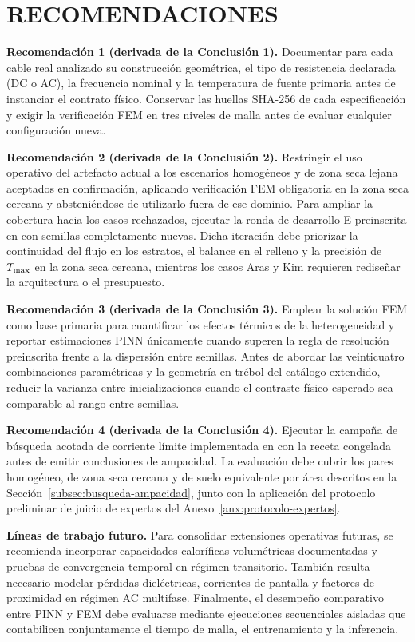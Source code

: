 \section{RECOMENDACIONES}

\textbf{Recomendación 1 (derivada de la Conclusión 1).} Documentar para cada cable real analizado su construcción geométrica, el tipo de resistencia declarada (DC o AC), la frecuencia nominal y la temperatura de fuente primaria antes de instanciar el contrato físico. Conservar las huellas SHA-256 de cada especificación y exigir la verificación FEM en tres niveles de malla antes de evaluar cualquier configuración nueva.

\textbf{Recomendación 2 (derivada de la Conclusión 2).} Restringir el uso operativo del artefacto actual a los escenarios homogéneos y de zona seca lejana aceptados en confirmación, aplicando verificación FEM obligatoria en la zona seca cercana y absteniéndose de utilizarlo fuera de ese dominio. Para ampliar la cobertura hacia los casos rechazados, ejecutar la ronda de desarrollo E preinscrita en  con semillas completamente nuevas. Dicha iteración debe priorizar la continuidad del flujo en los estratos, el balance en el relleno y la precisión de $T_{\max}$ en la zona seca cercana, mientras los casos Aras y Kim requieren rediseñar la arquitectura o el presupuesto.

\textbf{Recomendación 3 (derivada de la Conclusión 3).} Emplear la solución FEM como base primaria para cuantificar los efectos térmicos de la heterogeneidad y reportar estimaciones PINN únicamente cuando superen la regla de resolución preinscrita frente a la dispersión entre semillas. Antes de abordar las veinticuatro combinaciones paramétricas y la geometría en trébol del catálogo extendido, reducir la varianza entre inicializaciones cuando el contraste físico esperado sea comparable al rango entre semillas.

\textbf{Recomendación 4 (derivada de la Conclusión 4).} Ejecutar la campaña de búsqueda acotada de corriente límite implementada en  con la receta congelada antes de emitir conclusiones de ampacidad. La evaluación debe cubrir los pares homogéneo, de zona seca cercana y de suelo equivalente por área descritos en la Sección~\ref{subsec:busqueda-ampacidad}, junto con la aplicación del protocolo preliminar de juicio de expertos del Anexo~\ref{anx:protocolo-expertos}.

\textbf{Líneas de trabajo futuro.} Para consolidar extensiones operativas futuras, se recomienda incorporar capacidades caloríficas volumétricas documentadas y pruebas de convergencia temporal en régimen transitorio. También resulta necesario modelar pérdidas dieléctricas, corrientes de pantalla y factores de proximidad en régimen AC multifase. Finalmente, el desempeño comparativo entre PINN y FEM debe evaluarse mediante ejecuciones secuenciales aisladas que contabilicen conjuntamente el tiempo de malla, el entrenamiento y la inferencia.

